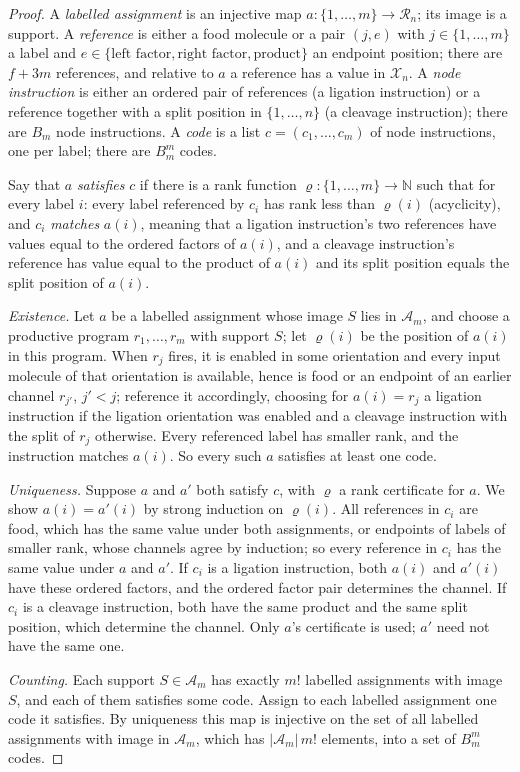 \documentclass[11pt,a4paper]{article}
\theoremstyle{plain}
\theoremstyle{definition}
\theoremstyle{remark}
\newcommand{\Nat}{\mathbb N}
\newcommand{\cA}{\mathcal A}
\newcommand{\cR}{\mathcal R}
\newcommand{\cX}{\mathcal X}
\begin{document}
\begin{proof}
A \emph{labelled assignment} is an injective map $a\colon\{1,\dots,m\}\to\cR_n$; its image is a support. A \emph{reference} is either a food molecule or a pair $(j,e)$ with $j\in\{1,\dots,m\}$ a label and $e\in\{\text{left factor},\text{right factor},\text{product}\}$ an endpoint position; there are $f+3m$ references, and relative to $a$ a reference has a value in $\cX_n$. A \emph{node instruction} is either an ordered pair of references (a ligation instruction) or a reference together with a split position in $\{1,\dots,n\}$ (a cleavage instruction); there are $B_m$ node instructions. A \emph{code} is a list $c=(c_1,\dots,c_m)$ of node instructions, one per label; there are $B_m^m$ codes.

Say that $a$ \emph{satisfies} $c$ if there is a rank function $\varrho\colon\{1,\dots,m\}\to\Nat$ such that for every label $i$: every label referenced by $c_i$ has rank less than $\varrho(i)$ (acyclicity), and $c_i$ \emph{matches} $a(i)$, meaning that a ligation instruction's two references have values equal to the ordered factors of $a(i)$, and a cleavage instruction's reference has value equal to the product of $a(i)$ and its split position equals the split position of $a(i)$.

\emph{Existence.} Let $a$ be a labelled assignment whose image $S$ lies in $\cA_m$, and choose a productive program $r_1,\dots,r_m$ with support $S$; let $\varrho(i)$ be the position of $a(i)$ in this program. When $r_j$ fires, it is enabled in some orientation and every input molecule of that orientation is available, hence is food or an endpoint of an earlier channel $r_{j'}$, $j'<j$; reference it accordingly, choosing for $a(i)=r_j$ a ligation instruction if the ligation orientation was enabled and a cleavage instruction with the split of $r_j$ otherwise. Every referenced label has smaller rank, and the instruction matches $a(i)$. So every such $a$ satisfies at least one code.

\emph{Uniqueness.} Suppose $a$ and $a'$ both satisfy $c$, with $\varrho$ a rank certificate for $a$. We show $a(i)=a'(i)$ by strong induction on $\varrho(i)$. All references in $c_i$ are food, which has the same value under both assignments, or endpoints of labels of smaller rank, whose channels agree by induction; so every reference in $c_i$ has the same value under $a$ and $a'$. If $c_i$ is a ligation instruction, both $a(i)$ and $a'(i)$ have these ordered factors, and the ordered factor pair determines the channel. If $c_i$ is a cleavage instruction, both have the same product and the same split position, which determine the channel. Only $a$'s certificate is used; $a'$ need not have the same one.

\emph{Counting.} Each support $S\in\cA_m$ has exactly $m!$ labelled assignments with image $S$, and each of them satisfies some code. Assign to each labelled assignment one code it satisfies. By uniqueness this map is injective on the set of all labelled assignments with image in $\cA_m$, which has $|\cA_m|\,m!$ elements, into a set of $B_m^m$ codes.
\end{proof}
\end{document}

